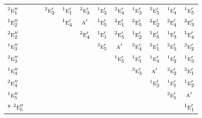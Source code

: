 \documentclass[10pt,a4paper]{article}
\numberwithin{equation}{section}
\newcommand{\irr}[1]{\text{\normalfont\scshape #1}}
\newcommand{\conjpair}[1]{{}^{#1}}
\begin{document}
{\begin{longtable}{@{}lccccccccccc@{}}
$\conjpair{2}\irr{e}_{1}''$ &  &  & $\conjpair{2}\irr{e}_{2}'$ & $\conjpair{1}\irr{e}_{1}'$ & $\conjpair{2}\irr{e}_{3}'$ & $\conjpair{1}\irr{e}_{2}'$ & $\conjpair{2}\irr{e}_{4}'$ & $\conjpair{1}\irr{e}_{3}'$ & $\conjpair{2}\irr{e}_{5}'$ & $\conjpair{1}\irr{e}_{4}'$ & $\conjpair{1}\irr{e}_{5}'$\\
$\conjpair{1}\irr{e}_{2}''$ &  &  &  & $\conjpair{1}\irr{e}_{4}'$ & $\irr{a}'$ & $\conjpair{1}\irr{e}_{5}'$ & $\conjpair{2}\irr{e}_{1}'$ & $\conjpair{2}\irr{e}_{5}'$ & $\conjpair{2}\irr{e}_{2}'$ & $\conjpair{2}\irr{e}_{4}'$ & $\conjpair{2}\irr{e}_{3}'$\\
$\conjpair{2}\irr{e}_{2}''$ &  &  &  &  & $\conjpair{2}\irr{e}_{4}'$ & $\conjpair{1}\irr{e}_{1}'$ & $\conjpair{2}\irr{e}_{5}'$ & $\conjpair{1}\irr{e}_{2}'$ & $\conjpair{1}\irr{e}_{5}'$ & $\conjpair{1}\irr{e}_{3}'$ & $\conjpair{1}\irr{e}_{4}'$\\
$\conjpair{1}\irr{e}_{3}''$ &  &  &  &  &  & $\conjpair{2}\irr{e}_{5}'$ & $\irr{a}'$ & $\conjpair{2}\irr{e}_{4}'$ & $\conjpair{2}\irr{e}_{1}'$ & $\conjpair{2}\irr{e}_{3}'$ & $\conjpair{2}\irr{e}_{2}'$\\
$\conjpair{2}\irr{e}_{3}''$ &  &  &  &  &  &  & $\conjpair{1}\irr{e}_{5}'$ & $\conjpair{1}\irr{e}_{1}'$ & $\conjpair{1}\irr{e}_{4}'$ & $\conjpair{1}\irr{e}_{2}'$ & $\conjpair{1}\irr{e}_{3}'$\\
$\conjpair{1}\irr{e}_{4}''$ &  &  &  &  &  &  &  & $\conjpair{2}\irr{e}_{3}'$ & $\irr{a}'$ & $\conjpair{2}\irr{e}_{2}'$ & $\conjpair{2}\irr{e}_{1}'$\\
$\conjpair{2}\irr{e}_{4}''$ &  &  &  &  &  &  &  &  & $\conjpair{1}\irr{e}_{3}'$ & $\conjpair{1}\irr{e}_{1}'$ & $\conjpair{1}\irr{e}_{2}'$\\
$\conjpair{1}\irr{e}_{5}''$ &  &  &  &  &  &  &  &  &  & $\conjpair{2}\irr{e}_{1}'$ & $\irr{a}'$\\*
$\conjpair{2}\irr{e}_{5}''$ &  &  &  &  &  &  &  &  &  &  & $\conjpair{1}\irr{e}_{1}'$\\
\bottomrule\end{longtable}}
\end{document}
